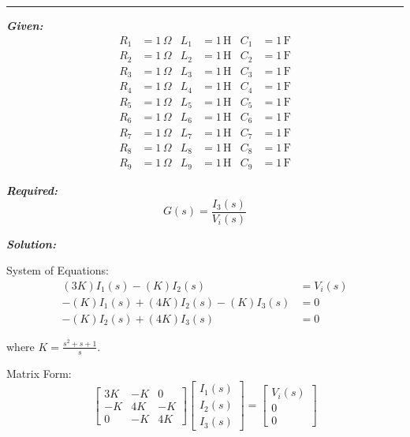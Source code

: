 ﻿\documentclass[11pt]{article}
\begin{document}

\noindent\rule{\textwidth}{1pt}

\vspace{12pt}

\noindent\textbf{\textit{Given:}}
\[
\begin{aligned}
R_1 &= 1\, \Omega & L_1 &= 1\, \text{H} & C_1 &= 1\, \text{F} \\
R_2 &= 1\, \Omega & L_2 &= 1\, \text{H} & C_2 &= 1\, \text{F} \\
R_3 &= 1\, \Omega & L_3 &= 1\, \text{H} & C_3 &= 1\, \text{F} \\
R_4 &= 1\, \Omega & L_4 &= 1\, \text{H} & C_4 &= 1\, \text{F} \\
R_5 &= 1\, \Omega & L_5 &= 1\, \text{H} & C_5 &= 1\, \text{F} \\
R_6 &= 1\, \Omega & L_6 &= 1\, \text{H} & C_6 &= 1\, \text{F} \\
R_7 &= 1\, \Omega & L_7 &= 1\, \text{H} & C_7 &= 1\, \text{F} \\
R_8 &= 1\, \Omega & L_8 &= 1\, \text{H} & C_8 &= 1\, \text{F} \\
R_9 &= 1\, \Omega & L_9 &= 1\, \text{H} & C_9 &= 1\, \text{F}
\end{aligned}
\]

\vspace{12pt}

\noindent \textbf{\textit{Required:}}
\[
G(s) = \frac{I_3(s)}{V_i(s)}
\]

\vspace{12pt}

\noindent \textbf{\textit{Solution:}}

\bigskip

{System of Equations:}
\[
\begin{aligned}
(3K)I_1(s) - (K)I_2(s) &= V_i(s) \\
-(K)I_1(s) + (4K)I_2(s) - (K)I_3(s) &= 0 \\
-(K)I_2(s) + (4K)I_3(s) &= 0
\end{aligned}
\]

{where $K = \frac{s^2 + s + 1}{s}$.}

{Matrix Form:}
\[
\begin{bmatrix}
3K & -K & 0 \\
-K & 4K & -K \\
0 & -K & 4K
\end{bmatrix}
\begin{bmatrix}
I_1(s) \\ I_2(s) \\ I_3(s)
\end{bmatrix}
=
\begin{bmatrix}
V_i(s) \\ 0 \\ 0
\end{bmatrix}
\]
\end{document}
